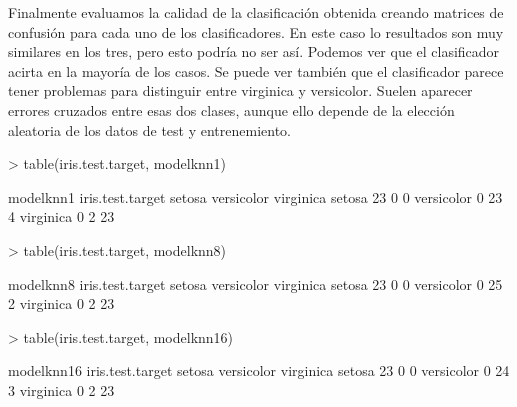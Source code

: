 \documentclass [a4paper] {article}
\begin{document}
Finalmente evaluamos la calidad de la clasificación obtenida creando matrices de confusión para cada uno de los clasificadores.
En este caso lo resultados son muy similares en los tres, pero esto podría no ser así.
Podemos ver que el clasificador acirta en la mayoría de los casos.
Se puede ver también que el clasificador parece tener problemas para distinguir entre virginica y versicolor.
Suelen aparecer errores cruzados entre esas dos clases, aunque ello depende de la elección aleatoria de los datos de test y entrenemiento.
\begin{Schunk}
\begin{Sinput}
> table(iris.test.target, modelknn1)
\end{Sinput}
\begin{Soutput}
                modelknn1
iris.test.target setosa versicolor virginica
      setosa         23          0         0
      versicolor      0         23         4
      virginica       0          2        23
\end{Soutput}
\begin{Sinput}
> table(iris.test.target, modelknn8)
\end{Sinput}
\begin{Soutput}
                modelknn8
iris.test.target setosa versicolor virginica
      setosa         23          0         0
      versicolor      0         25         2
      virginica       0          2        23
\end{Soutput}
\begin{Sinput}
> table(iris.test.target, modelknn16)
\end{Sinput}
\begin{Soutput}
                modelknn16
iris.test.target setosa versicolor virginica
      setosa         23          0         0
      versicolor      0         24         3
      virginica       0          2        23
\end{Soutput}
\end{Schunk}
\end{document}
